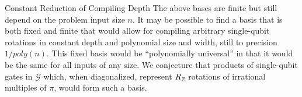\begin{conjecture}{Constant Reduction of Compiling Depth}
The above bases are finite but still depend on the problem input
size $n$. It may be possible to find a basis that
is both fixed and finite that would allow for compiling
arbitrary single-qubit rotations in constant depth and polynomial
size and width, still to precision $1 / poly(n)$. This fixed
basis would be ``polynomially universal'' in that it would be
the same for all inputs of any size.
We conjecture that products of single-qubit gates in
$\mathcal{G}$ which, when diagonalized, represent $R_Z$ rotations
of irrational multiples of $\pi$, would form such a basis.
\end{conjecture}
